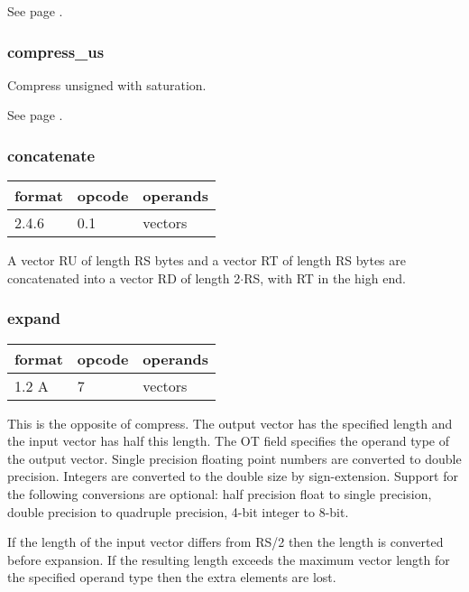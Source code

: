 \documentclass[forwardcom.tex]{subfiles}
\begin{document}
See page \pageref{table:compressSsInstruction}.

\subsubsection{compress\_us}
Compress unsigned with saturation.

See page \pageref{table:compressUsInstruction}.

\subsubsection{concatenate}
\label{table:concatenateInstruction}
\begin{tabular}{|p{12mm}|p{12mm}|p{110mm}|}
\hline
\bfseries format & \bfseries opcode & \bfseries operands \\ \hline
2.4.6 & 0.1 & vectors \\ \hline
\end{tabular}
\vspace{2mm}

A vector RU of length RS bytes and a vector RT of
length RS bytes are concatenated into a vector RD
of length 2$\cdot$RS, with RT in the high end.

\subsubsection{expand}
\label{table:expandInstruction}
\begin{tabular}{|p{12mm}|p{12mm}|p{110mm}|}
\hline
\bfseries format & \bfseries opcode & \bfseries operands \\ \hline
1.2 A & 7 & vectors \\ \hline
\end{tabular}
\vspace{2mm}

This is the opposite of compress. The output vector has the specified length and the input vector has half this length. The OT field specifies the operand type of the output vector. Single precision floating point numbers are converted to double precision. Integers are converted to the double size by sign-extension. Support for the following conversions are optional: half precision float to single precision, double precision to quadruple precision, 4-bit integer to 8-bit.
\vspace{2mm}

If the length of the input vector differs from RS/2 then the length is converted before expansion. If the resulting length exceeds the maximum vector length for the specified operand type then the extra elements are lost.
\end{document}
